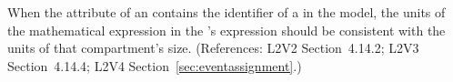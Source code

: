 When the  attribute of an \EventAssignment
contains the identifier of a \Compartment in the model, the
units of the mathematical expression in the
\EventAssignment's  expression should be
consistent with the units of that compartment's size.
(References: L2V2 Section~4.14.2; L2V3 Section~4.14.4; L2V4 Section~\ref{sec:eventassignment}.)
